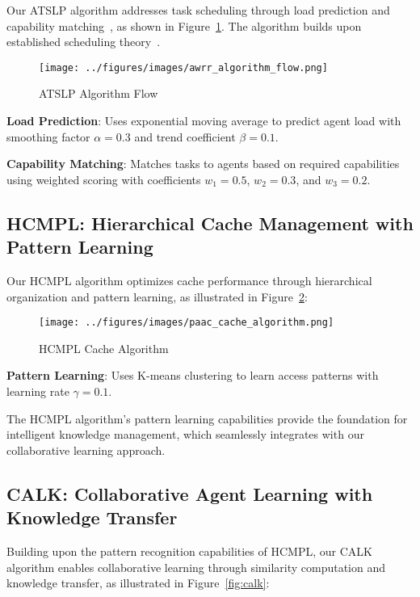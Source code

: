 \documentclass[conference]{IEEEtran}
\begin{document}
Our ATSLP algorithm addresses task scheduling through load prediction and capability matching~\cite{kleinberg2006algorithm}, as shown in Figure~\ref{fig:atslp}. The algorithm builds upon established scheduling theory~\cite{tanenbaum2016structured}.

\begin{figure}[htbp]
\centering
\texttt{[image: ../figures/images/awrr\_algorithm\_flow.png]}
\caption{ATSLP Algorithm Flow}
\label{fig:atslp}
\end{figure}

\textbf{Load Prediction}: Uses exponential moving average to predict agent load with smoothing factor $\alpha = 0.3$ and trend coefficient $\beta = 0.1$.

\textbf{Capability Matching}: Matches tasks to agents based on required capabilities using weighted scoring with coefficients $w_1 = 0.5$, $w_2 = 0.3$, and $w_3 = 0.2$.

\subsection{HCMPL: Hierarchical Cache Management with Pattern Learning}

Our HCMPL algorithm optimizes cache performance through hierarchical organization and pattern learning, as illustrated in Figure~\ref{fig:hcmpl}:

\begin{figure}[htbp]
\centering
\texttt{[image: ../figures/images/paac\_cache\_algorithm.png]}
\caption{HCMPL Cache Algorithm}
\label{fig:hcmpl}
\end{figure}

\textbf{Pattern Learning}: Uses K-means clustering to learn access patterns with learning rate $\gamma = 0.1$.

The HCMPL algorithm's pattern learning capabilities provide the foundation for intelligent knowledge management, which seamlessly integrates with our collaborative learning approach.

\subsection{CALK: Collaborative Agent Learning with Knowledge Transfer}

Building upon the pattern recognition capabilities of HCMPL, our CALK algorithm enables collaborative learning through similarity computation and knowledge transfer, as illustrated in Figure~\ref{fig:calk}:
\end{document}
